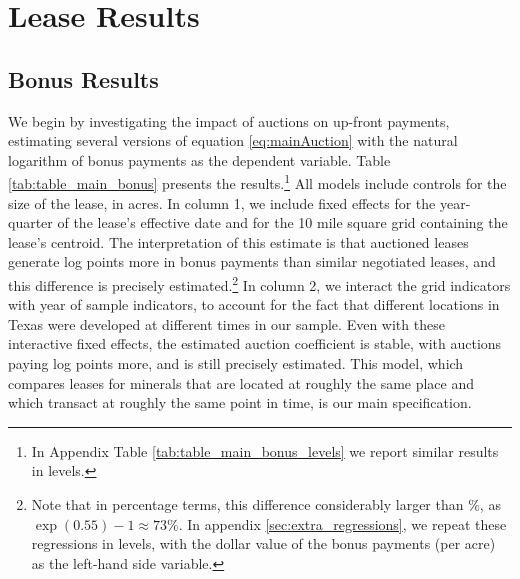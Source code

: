 \documentclass[12pt]{article}
\newcommand{\inputy}[1]{\unskip}
\begin{document}
\section{Lease Results \label{sec:ResultsLease}}

\subsection{Bonus Results \label{subsec:ResultsLeaseBonus}}
We begin by investigating the impact of auctions on up-front payments, estimating several versions of equation \ref{eq:mainAuction} with the natural logarithm of bonus payments as the dependent variable. Table \ref{tab:table_main_bonus} presents the results.\footnote{In Appendix Table \ref{tab:table_main_bonus_levels} we report similar results in levels.} All models include controls for the size of the lease, in acres. In column 1, we include fixed effects for the year-quarter of the lease's effective date and for the 10 mile square grid containing the lease's centroid. The interpretation of this estimate is that auctioned leases generate \inputy{../output/estimates/Bonus_Grid10_log.tex} log points more in bonus payments than similar negotiated leases, and this difference is precisely estimated.\footnote{Note that in percentage terms, this difference considerably larger than \inputy{../output/estimates/Bonus_Grid10_log.tex}\%, as $\exp(0.55) - 1 \approx 73\%$. In appendix \ref{sec:extra_regressions}, we repeat these regressions in levels, with the dollar value of the bonus payments (per acre) as the left-hand side variable.}  In column 2, we interact the grid indicators with year of sample indicators, to account for the fact that different locations in Texas were developed at different times in our sample. Even with these interactive fixed effects, the estimated auction coefficient is stable, with auctions paying \inputy{../output/estimates/Bonus_Grid10Yr_log.tex} log points more, and is still precisely estimated. This model, which compares leases for minerals that are located at roughly the same place and which transact at roughly the same point in time, is our main specification. 
\end{document}
